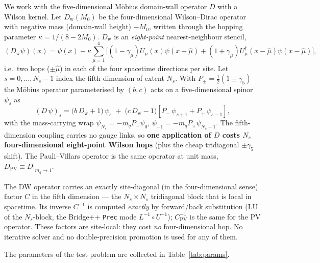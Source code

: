 \documentclass[12pt,a4paper]{article}
\newcommand{\Dw}{D_{\mathrm{w}}}
\newcommand{\Ddw}{D}
\newcommand{\Dpv}{D_{\mathrm{PV}}}
\newcommand{\Cinv}{C^{-1}}
\newcommand{\Cpvinv}{C_{\mathrm{PV}}^{-1}}
\newcommand{\Pp}{P_{+}}
\newcommand{\Pm}{P_{-}}
\newcommand{\dg}{^{\dagger}}
\begin{document}
We work with the five-dimensional M\"obius domain-wall operator $\Ddw$ with a
Wilson kernel. Let $\Dw(M_0)$ be the four-dimensional Wilson--Dirac operator with
negative mass (domain-wall height) $-M_0$, written through the hopping parameter
$\kappa = 1/(8-2M_0)$. $\Dw$ is an \emph{eight-point} nearest-neighbour stencil,
\begin{equation}
(\Dw\psi)(x) = \psi(x) - \kappa\sum_{\mu=1}^{4}\Big[
(1-\gamma_\mu)U_\mu(x)\psi(x+\hat\mu)
+ (1+\gamma_\mu)U_\mu\dg(x-\hat\mu)\psi(x-\hat\mu)\Big],
\end{equation}
i.e.\ two hops ($\pm\hat\mu$) in each of the four spacetime directions per site.
Let $s=0,\dots,N_s-1$ index the fifth dimension of extent $N_s$. With
$P_\pm=\tfrac12(1\pm\gamma_5)$ the M\"obius operator parameterised by $(b,c)$ acts
on a five-dimensional spinor $\psi_s$ as
\begin{equation}
(\Ddw\,\psi)_s
= \big(b\,\Dw + 1\big)\,\psi_s
\;+\; \big(c\,\Dw - 1\big)\!\left[ \Pm \,\psi_{s+1} + \Pp\,\psi_{s-1} \right],
\end{equation}
with the mass-carrying wrap $\psi_{N_s} = -m_q \Pm \psi_0$,
$\psi_{-1} = -m_q \Pp \psi_{N_s-1}$. The fifth-dimension coupling carries no gauge
links, so \textbf{one application of $\Ddw$ costs $N_s$ four-dimensional
eight-point Wilson hops} (plus the cheap tridiagonal $\pm\gamma_5$ shift). The
Pauli--Villars operator is the same operator at unit mass,
$\Dpv \equiv \Ddw\big|_{m_q\to1}$.

The DW operator carries an exactly site-diagonal (in the four-dimensional sense)
factor $C$ in the fifth dimension --- the $N_s\times N_s$ tridiagonal block that
is local in spacetime. Its inverse $\Cinv$ is computed \emph{exactly} by
forward/back substitution (LU of the $N_s$-block, the Bridge++ \texttt{Prec} mode
$L^{-1}\!\circ U^{-1}$); $\Cpvinv$ is the same for the PV operator. These factors
are site-local: they cost \emph{no} four-dimensional hop. No iterative solver and
no double-precision promotion is used for any of them.

The parameters of the test problem are collected in Table~\ref{tab:params}.
\end{document}
